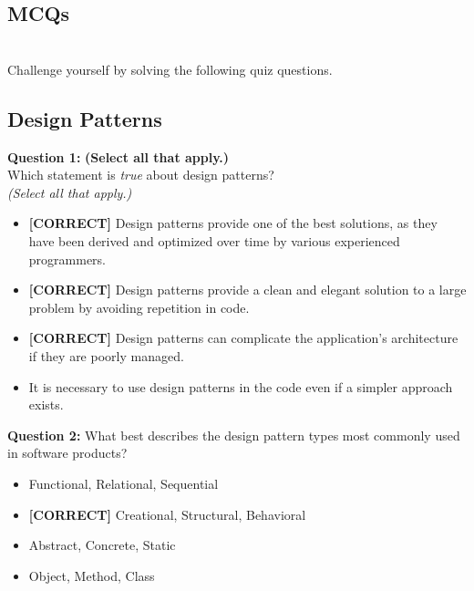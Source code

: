 

\subsection{MCQs}\label{MCQs}
\\
Challenge yourself by solving the following quiz questions.

\subsection*{Design Patterns}
\vspace{0.3cm}
\noindent
\textbf{Question 1:} \textbf{(Select all that apply.)}
\\
Which statement is \emph{true} about design patterns?
\\
\textit{(Select all that apply.)}
\\[0.2cm]
\begin{itemize}
 \item \textbf{[CORRECT]} Design patterns provide one of the best solutions, as they have been derived and optimized over time by various experienced programmers.
 \item \textbf{[CORRECT]} Design patterns provide a clean and elegant solution to a large problem by avoiding repetition in code.
 \item \textbf{[CORRECT]} Design patterns can complicate the application's architecture if they are poorly managed.
 \item It is necessary to use design patterns in the code even if a simpler approach exists.
\end{itemize}
\vspace{0.3cm}
\noindent
\textbf{Question 2:} What best describes the design pattern types most commonly used in software products?
\\[0.2cm]
\begin{itemize}
 \item Functional, Relational, Sequential
 \item \textbf{[CORRECT]} Creational, Structural, Behavioral
 \item Abstract, Concrete, Static
 \item Object, Method, Class
\end{itemize}
